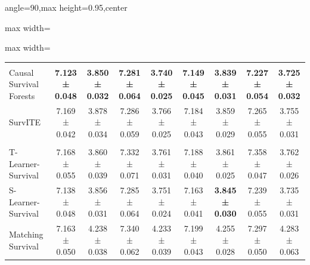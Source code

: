 \begin{table}[htbp]
{\begin{adjustbox}{angle=90,max height=0.95\textheight,center}
\begin{minipage}{\textheight}
\begin{adjustbox}{max width=\linewidth}
\begin{minipage}[c]{\linewidth}
\begin{adjustbox}{max width=\linewidth}
\begin{tabular}{l cc cc cc cc}
        \addlinespace
        \multicolumn{7}{l}{\textit{Direct-Survival CATE Methods}} \\
        Causal Survival Forests & \textbf{7.123 ± 0.048} & \textbf{3.850 ± 0.032} & \textbf{7.281 ± 0.064} & \textbf{3.740 ± 0.025} & \textbf{7.149 ± 0.045} & \textbf{3.839 ± 0.031} & \textbf{7.227 ± 0.054} & \textbf{3.725 ± 0.032} \\
        SurvITE & 7.169 ± 0.042 & 3.878 ± 0.034 & 7.286 ± 0.059 & 3.766 ± 0.025 & 7.184 ± 0.043 & 3.859 ± 0.029 & 7.265 ± 0.055 & 3.755 ± 0.031 \\ 
        \addlinespace
        \multicolumn{7}{l}{\textit{Survival Meta-Learners}} \\
        T-Learner-Survival & 7.168 ± 0.055 & 3.860 ± 0.039 & 7.332 ± 0.071 & 3.761 ± 0.031 & 7.188 ± 0.040 & 3.861 ± 0.025 & 7.358 ± 0.047 & 3.762 ± 0.026 \\ 
        S-Learner-Survival & 7.138 ± 0.048 & 3.856 ± 0.031 & 7.285 ± 0.064 & 3.751 ± 0.024 & 7.163 ± 0.041 & \textbf{3.845 ± 0.030} & 7.239 ± 0.055 & 3.735 ± 0.031 \\
        Matching Survival & 7.163 ± 0.050 & 4.238 ± 0.038 & 7.340 ± 0.062 & 4.233 ± 0.039 & 7.199 ± 0.043 & 4.255 ± 0.028 & 7.297 ± 0.050 & 4.283 ± 0.063 \\ 
        \bottomrule
    \end{tabular}\end{adjustbox}
    \end{minipage}\end{adjustbox}\par
    \end{minipage}
    \end{adjustbox}
}
\end{table}
\endgroup